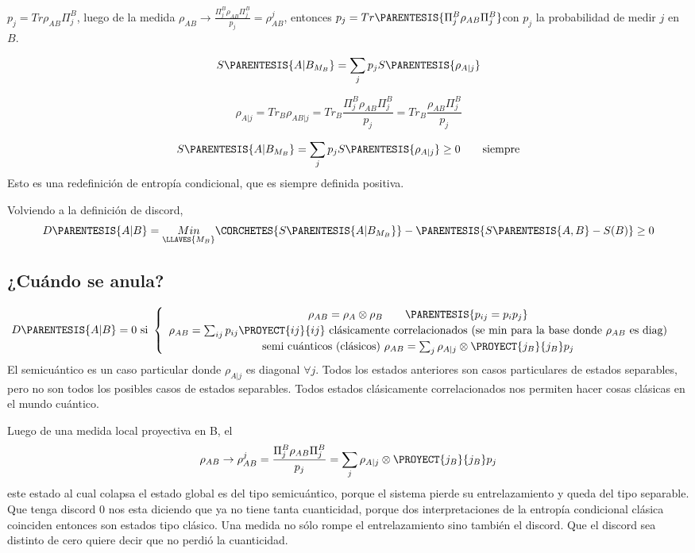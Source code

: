 $p_{j}=Tr\rho_{AB}\Pi_{j}^{B}$, luego de la medida $\rho_{AB}\rightarrow\frac{\Pi_{j}^{B}\rho_{AB}\Pi_{j}^{B}}{p_{j}}=\rho_{AB}^{j}$,
entonces $p_{j}=Tr\PARENTESIS{\Pi_{j}^{B}\rho_{AB}\Pi_{j}^{B}}$con
$p_{j}$ la probabilidad de medir $j$ en $B$.

\[
S\PARENTESIS{A|B_{M_{B}}}=\sum_{j}p_{j}S\PARENTESIS{\rho_{A|j}}
\]

\[
\rho_{A|j}=Tr_{B}\rho_{AB|j}=Tr_{B}\frac{\Pi_{j}^{B}\rho_{AB}\Pi_{j}^{B}}{p_{j}}=Tr_{B}\frac{\rho_{AB}\Pi_{j}^{B}}{p_{j}}
\]

\[
S\PARENTESIS{A|B_{M_{B}}}=\sum_{j}p_{j}S\PARENTESIS{\rho_{A|j}}\geq0\qquad\text{siempre}
\]
Esto es una redefinición de entropía condicional, que es siempre definida
positiva. 

Volviendo a la definición de discord, 
\[
D\PARENTESIS{A|B}=\underset{\LLAVES{M_{B}}}{Min}\CORCHETES{S\PARENTESIS{A|B_{M_{B}}}}-\PARENTESIS{S\PARENTESIS{A,B}-S(B)}\ge0
\]


\subsection{¿Cuándo se anula?}

\[
D\PARENTESIS{A|B}=0\text{ si }\begin{cases}
\begin{array}{c}
\rho_{AB}=\rho_{A}\otimes\rho_{B}\qquad\PARENTESIS{p_{ij}=p_{i}p_{j}}\\
\rho_{AB}=\sum_{ij}p_{ij}\PROYECT{ij}{ij}\text{ clásicamente correlacionados (se min para la base donde \ensuremath{\rho_{AB}} es diag)}\\
\text{semi cuánticos (clásicos) }\rho_{AB}=\sum_{j}\rho_{A|j}\otimes\PROYECT{j_{B}}{j_{B}}p_{j}
\end{array}\end{cases}
\]
El semicuántico es un caso particular donde $\rho_{A|j}$ es diagonal
$\forall j$. Todos los estados anteriores son casos particulares
de estados separables, pero no son todos los posibles casos de estados
separables. Todos estados clásicamente correlacionados nos permiten
hacer cosas clásicas en el mundo cuántico.

Luego de una medida local proyectiva en B, el 
\[
\rho_{AB}\rightarrow\rho_{AB}^{j}=\frac{\Pi_{j}^{B}\rho_{AB}\Pi_{j}^{B}}{p_{j}}=\sum_{j}\rho_{A|j}\otimes\PROYECT{j_{B}}{j_{B}}p_{j}
\]
este estado al cual colapsa el estado global es del tipo semicuántico,
porque el sistema pierde su entrelazamiento y queda del tipo separable.
Que tenga discord 0 nos esta diciendo que ya no tiene tanta cuanticidad,
porque dos interpretaciones de la entropía condicional clásica coinciden
entonces son estados tipo clásico. Una medida no sólo rompe el entrelazamiento
sino también el discord. Que el discord sea distinto de cero quiere
decir que no perdió la cuanticidad. 

